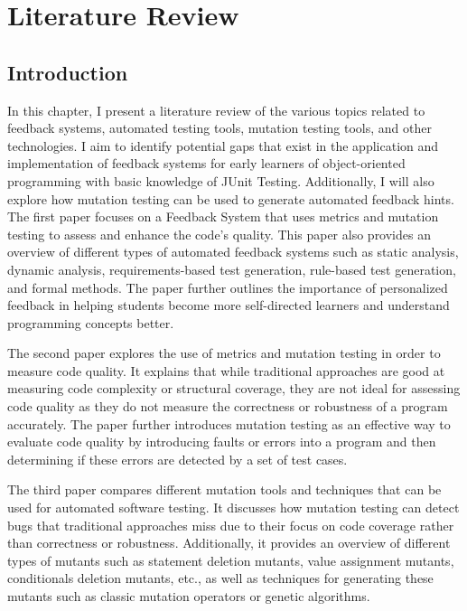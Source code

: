\chapter{Literature Review}
\label{chapter:Literature Review}

\section{Introduction}

In this chapter, I present a literature review of the various topics related to feedback systems, automated testing tools, mutation testing tools, and other technologies. I aim to identify potential gaps that exist in the application and implementation of feedback systems for early learners of object-oriented programming with basic knowledge of JUnit Testing. Additionally, I will also explore how mutation testing can be used to generate automated feedback hints. \\

The first paper focuses on a Feedback System that uses metrics and mutation testing to assess and enhance the code's quality. This paper also provides an overview of different types of automated feedback systems such as static analysis, dynamic analysis, requirements-based test generation, rule-based test generation, and formal methods. The paper further outlines the importance of personalized feedback in helping students become more self-directed learners and understand programming concepts better. \par

The second paper explores the use of metrics and mutation testing in order to measure code quality. It explains that while traditional approaches are good at measuring code complexity or structural coverage, they are not ideal for assessing code quality as they do not measure the correctness or robustness of a program accurately. The paper further introduces mutation testing as an effective way to evaluate code quality by introducing faults or errors into a program and then determining if these errors are detected by a set of test cases. \par

The third paper compares different mutation tools and techniques that can be used for automated software testing. It discusses how mutation testing can detect bugs that traditional approaches miss due to their focus on code coverage rather than correctness or robustness. Additionally, it provides an overview of different types of mutants such as statement deletion mutants, value assignment mutants, conditionals deletion mutants, etc., as well as techniques for generating these mutants such as classic mutation operators or genetic algorithms. \par

